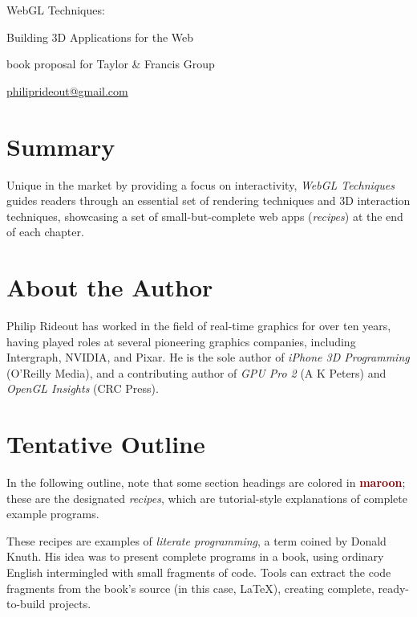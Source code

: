\thispagestyle{empty}
\label{Proposal}
\LARGE
\noindent WebGL Techniques:

\large
\noindent Building 3D Applications for the Web
\small

\vspace{0.25in}
\noindent book proposal for Taylor \& Francis Group

\noindent \href{mailto:philiprideout@gmail.com}{philiprideout@gmail.com}
\normalsize

\renewcommand{\labelenumi}{Chapter \arabic{enumi}. }

\section*{Summary}
Unique in the market by providing a focus on interactivity, \emph{WebGL Techniques} guides readers through an essential set of rendering techniques and 3D interaction techniques, showcasing a set of small-but-complete web apps (\emph{recipes}) at the end of each chapter.

\section*{About the Author}

Philip Rideout has worked in the field of real-time graphics for over ten years, having played roles at several pioneering graphics companies, including Intergraph, NVIDIA, and Pixar.  He is the sole author of \emph{iPhone 3D Programming} (O'Reilly Media), and a contributing author of \emph{GPU Pro 2} (A K Peters) and \emph{OpenGL Insights} (CRC Press).

\section*{Tentative Outline}

In the following outline, note that some section headings are colored in \textbf{\textcolor{Maroon}{maroon}}; these are the designated \emph{recipes}, which are tutorial-style explanations of complete example programs.

These recipes are examples of \emph{literate programming}, a term coined by Donald Knuth.  His idea was to present complete programs in a book, using ordinary English intermingled with small fragments of code.  Tools can extract the code fragments from the book's source (in this case, \LaTeX), creating complete, ready-to-build projects.

\newcommand{\verbiage}[2] {\item \textbf{#1} \footnotesize#2\normalsize}
\newcommand{\rrecipe}[2] {\item \textbf{\textcolor{Maroon}{#1}} \footnotesize#2\normalsize}
\newcommand{\irecipe}[2] {\item \textbf{\textcolor{Maroon}{#1}} \footnotesize#2\normalsize}
\newcommand{\arecipe}[2] {\item \textbf{\textcolor{Maroon}{#1}} \footnotesize#2\normalsize}

